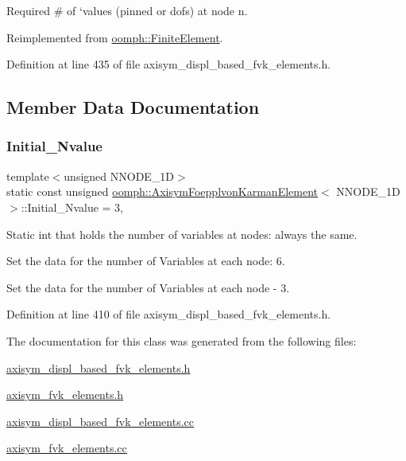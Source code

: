 Required \# of `values\textquotesingle{} (pinned or dofs) at node n. 



Reimplemented from \hyperlink{classoomph_1_1FiniteElement_a56610c60d5bc2d7c27407a1455471b1a}{oomph\+::\+Finite\+Element}.



Definition at line 435 of file axisym\+\_\+displ\+\_\+based\+\_\+fvk\+\_\+elements.\+h.



\subsection{Member Data Documentation}
\mbox{\label{classoomph_1_1AxisymFoepplvonKarmanElement_a881cfa4e7a54d746002871a99337eae8}} 
\subsubsection{\texorpdfstring{Initial\+\_\+\+Nvalue}{Initial\_Nvalue}}
{\footnotesize\ttfamily template$<$unsigned N\+N\+O\+D\+E\+\_\+1D$>$ \\
static const unsigned \hyperlink{classoomph_1_1AxisymFoepplvonKarmanElement}{oomph\+::\+Axisym\+Foepplvon\+Karman\+Element}$<$ N\+N\+O\+D\+E\+\_\+1D $>$\+::Initial\+\_\+\+Nvalue = 3\hspace{0.3cm}{\ttfamily [static]}, {\ttfamily [private]}}



Static int that holds the number of variables at nodes\+: always the same. 

Set the data for the number of Variables at each node\+: 6.

Set the data for the number of Variables at each node -\/ 3. 

Definition at line 410 of file axisym\+\_\+displ\+\_\+based\+\_\+fvk\+\_\+elements.\+h.



The documentation for this class was generated from the following files\+:\begin{DoxyCompactItemize}
\item 
\hyperlink{axisym__displ__based__fvk__elements_8h}{axisym\+\_\+displ\+\_\+based\+\_\+fvk\+\_\+elements.\+h}\item 
\hyperlink{axisym__fvk__elements_8h}{axisym\+\_\+fvk\+\_\+elements.\+h}\item 
\hyperlink{axisym__displ__based__fvk__elements_8cc}{axisym\+\_\+displ\+\_\+based\+\_\+fvk\+\_\+elements.\+cc}\item 
\hyperlink{axisym__fvk__elements_8cc}{axisym\+\_\+fvk\+\_\+elements.\+cc}\end{DoxyCompactItemize}
